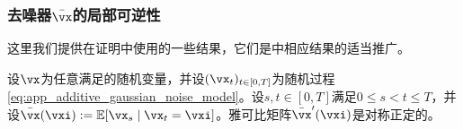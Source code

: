 \documentclass[../../book-main.tex]{subfiles}
\begin{document}
\subsubsection{去噪器\(\bar{\vx}\)的局部可逆性}

这里我们提供在证明中使用的一些结果，它们是\cite{Gribonval2011-pf}中相应结果的适当推广。

\begin{lemma}\label{lem:gribonval_A1}
    设\(\vx\)为任意满足的随机变量，并设\((\vx_{t})_{t \in [0, T]}\)为随机过程\eqref{eq:app_additive_gaussian_noise_model}。设\(s, t \in [0, T]\)满足\(0 \leq s < t \leq T\)，并设\(\bar{\vx}(\vxi) := \Ex[\vx_{s} \mid \vx_{t} = \vxi]\)。雅可比矩阵\(\bar{\vx}^{\prime}(\vxi)\)是对称正定的。
\end{lemma}
\end{document}
